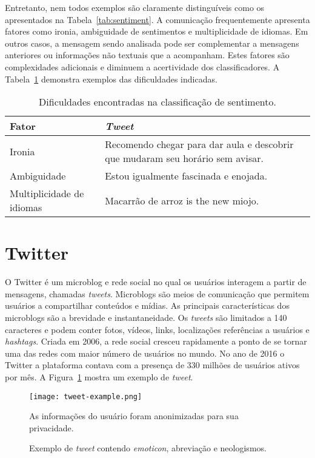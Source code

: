 Entretanto, nem todos exemplos são claramente distinguíveis como os apresentados na Tabela~\ref{tab:sentiment}.
A comunicação frequentemente apresenta fatores como ironia, ambiguidade de sentimentos e multiplicidade de idiomas.
Em outros casos, a mensagem sendo analisada pode ser complementar a mensagens anteriores ou informações não textuais
que a acompanham.
Estes fatores são complexidades adicionais e diminuem a acertividade dos classificadores.
A Tabela~\ref{tab:sentiment_complexity} demonstra exemplos das dificuldades indicadas.

\begin{table}[h]
    \begin{center}
        \begin{tabular}{| l | p{10cm} |}
        \hline
        \textbf{Fator} & \textbf{\textit{Tweet}} \\ \hline
        Ironia & Recomendo chegar para dar aula e descobrir que mudaram seu horário sem avisar. \\ \hline
        Ambiguidade & Estou igualmente fascinada e enojada. \\ \hline
        Multiplicidade de idiomas & Macarrão de arroz is the new miojo. \\ \hline
        \end{tabular}
        \caption{Dificuldades encontradas na classificação de sentimento.}
        \label{tab:sentiment_complexity}
    \end{center}
\end{table}

\section{Twitter}

O Twitter é um microblog e rede social no qual os usuários interagem a partir de mensagens, chamadas \textit{tweets}.
Microblogs são meios de comunicação que permitem usuários a compartilhar conteúdos e mídias.
As principais características dos microblogs são a brevidade e instantaneidade.
Os \textit{tweets} são limitados a 140 caracteres e podem conter fotos, vídeos, links, localizações referências a
usuários e \textit{hashtags}.
Criada em 2006, a rede social cresceu rapidamente a ponto de se tornar uma das redes com maior número de usuários no
mundo.
No ano de 2016 o Twitter a plataforma contava com a presença de 330 milhões de usuários ativos por mês.
A Figura~\ref{fig:tweet_ex} mostra um exemplo de \textit{tweet}.

\begin{figure}
\begin{center} {
    \begin{center}
    \texttt{[image: tweet-example.png]}
    \caption{Exemplo de \textit{tweet} contendo \textit{emoticon}, abreviação e neologismos.}
    \small{As informações do usuário foram anonimizadas para sua privacidade.}
    \label{fig:tweet_ex}
    \end{center}
}
\end{center}
\end{figure}

